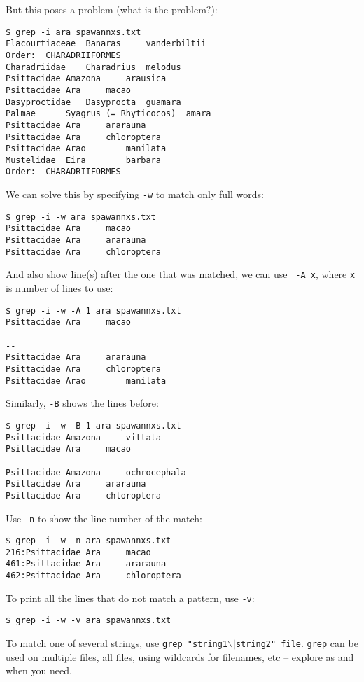 But this poses a problem (what is the problem?):

\begin{lstlisting}
$ grep -i ara spawannxs.txt
Flacourtiaceae	Banaras		vanderbiltii
Order:	CHARADRIIFORMES
Charadriidae	Charadrius	melodus
Psittacidae	Amazona		arausica
Psittacidae	Ara		macao
Dasyproctidae	Dasyprocta	guamara
Palmae		Syagrus (= Rhyticocos)	amara
Psittacidae	Ara		ararauna
Psittacidae	Ara		chloroptera
Psittacidae	Arao		manilata
Mustelidae	Eira		barbara
Order:	CHARADRIIFORMES
\end{lstlisting}

We can solve this by specifying {\tt -w} to match only full words:
 
\begin{lstlisting}
$ grep -i -w ara spawannxs.txt
Psittacidae	Ara		macao
Psittacidae	Ara		ararauna
Psittacidae	Ara		chloroptera
\end{lstlisting}

And also show line(s) after the one that was  matched, we can use {\tt 
-A x}, where {\tt x} is number of lines to use:

\begin{lstlisting}
$ grep -i -w -A 1 ara spawannxs.txt
Psittacidae	Ara		macao

--
Psittacidae	Ara		ararauna
Psittacidae	Ara		chloroptera
Psittacidae	Arao		manilata
\end{lstlisting}

Similarly, {\tt -B} shows the lines before:
 
\begin{lstlisting}
$ grep -i -w -B 1 ara spawannxs.txt
Psittacidae	Amazona		vittata
Psittacidae	Ara		macao
--
Psittacidae	Amazona		ochrocephala
Psittacidae	Ara		ararauna
Psittacidae	Ara		chloroptera
\end{lstlisting}

Use {\tt -n} to show the line number of the match:
 
\begin{lstlisting}
$ grep -i -w -n ara spawannxs.txt
216:Psittacidae	Ara		macao
461:Psittacidae	Ara		ararauna
462:Psittacidae	Ara		chloroptera
\end{lstlisting}

To print all the lines that do not match a pattern, use {\tt -v}:
 
\begin{lstlisting}
$ grep -i -w -v ara spawannxs.txt
\end{lstlisting}

To match one of several strings, use {\tt grep 
"string1$\backslash\vert$string2" file}. {\tt grep} can be used on 
multiple files, all files, using wildcards for filenames, etc -- 
explore as and when you need.

